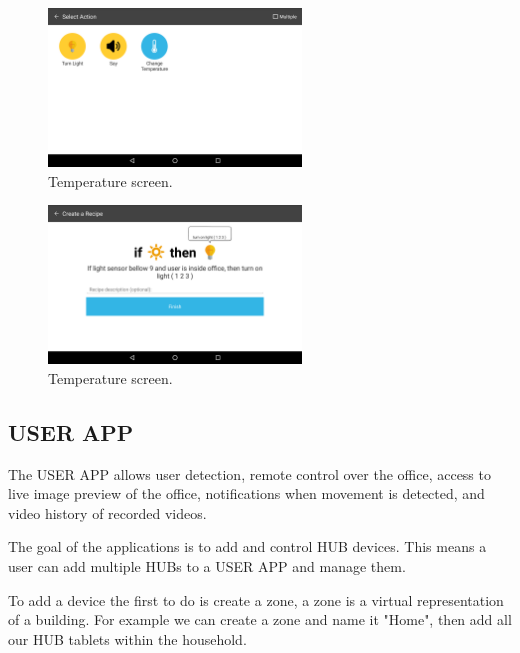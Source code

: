 \begin{figure}[H]
\centering
\includegraphics[width=0.6\textwidth]{Figures/screen_actions}
\caption{Temperature screen.}
\label{screen_actions}
\end{figure}

\begin{figure}[H]
\centering
\includegraphics[width=0.6\textwidth]{Figures/screen_completed_recipe}
\caption{Temperature screen.}
\label{screen_completed_recipe}
\end{figure}





\subsection{USER APP}


The USER APP allows user detection, remote control over the office, access to live image preview of the office, notifications when movement is detected, and video history of recorded videos.

The goal of the applications is to add and control HUB devices. This means a user can add multiple HUBs to a USER APP and manage them. 

To add a device the first to do is create a zone, a zone is a virtual representation of a building. For example we can create a zone and name it "Home", then add all our HUB tablets within the household. 


